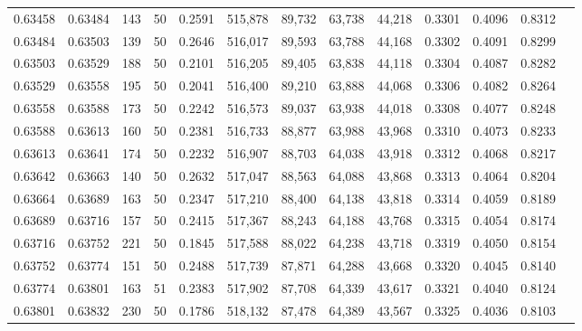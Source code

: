 \begin{tabular}{rrrrrrrrrrrrr}
0.63458 & 0.63484 &   143 &  50 &                                     0.2591 & 515,878 &  89,732 &  63,738 &  44,218 & 0.3301 & 0.4096 & 0.8312 \\
0.63484 & 0.63503 &   139 &  50 &                                     0.2646 & 516,017 &  89,593 &  63,788 &  44,168 & 0.3302 & 0.4091 & 0.8299 \\
0.63503 & 0.63529 &   188 &  50 &                                     0.2101 & 516,205 &  89,405 &  63,838 &  44,118 & 0.3304 & 0.4087 & 0.8282 \\
0.63529 & 0.63558 &   195 &  50 &                                     0.2041 & 516,400 &  89,210 &  63,888 &  44,068 & 0.3306 & 0.4082 & 0.8264 \\
0.63558 & 0.63588 &   173 &  50 &                                     0.2242 & 516,573 &  89,037 &  63,938 &  44,018 & 0.3308 & 0.4077 & 0.8248 \\
0.63588 & 0.63613 &   160 &  50 &                                     0.2381 & 516,733 &  88,877 &  63,988 &  43,968 & 0.3310 & 0.4073 & 0.8233 \\
0.63613 & 0.63641 &   174 &  50 &                                     0.2232 & 516,907 &  88,703 &  64,038 &  43,918 & 0.3312 & 0.4068 & 0.8217 \\
0.63642 & 0.63663 &   140 &  50 &                                     0.2632 & 517,047 &  88,563 &  64,088 &  43,868 & 0.3313 & 0.4064 & 0.8204 \\
0.63664 & 0.63689 &   163 &  50 &                                     0.2347 & 517,210 &  88,400 &  64,138 &  43,818 & 0.3314 & 0.4059 & 0.8189 \\
0.63689 & 0.63716 &   157 &  50 &                                     0.2415 & 517,367 &  88,243 &  64,188 &  43,768 & 0.3315 & 0.4054 & 0.8174 \\
0.63716 & 0.63752 &   221 &  50 &                                     0.1845 & 517,588 &  88,022 &  64,238 &  43,718 & 0.3319 & 0.4050 & 0.8154 \\
0.63752 & 0.63774 &   151 &  50 &                                     0.2488 & 517,739 &  87,871 &  64,288 &  43,668 & 0.3320 & 0.4045 & 0.8140 \\
0.63774 & 0.63801 &   163 &  51 &                                     0.2383 & 517,902 &  87,708 &  64,339 &  43,617 & 0.3321 & 0.4040 & 0.8124 \\
0.63801 & 0.63832 &   230 &  50 &                                     0.1786 & 518,132 &  87,478 &  64,389 &  43,567 & 0.3325 & 0.4036 & 0.8103 \\

\end{tabular}
